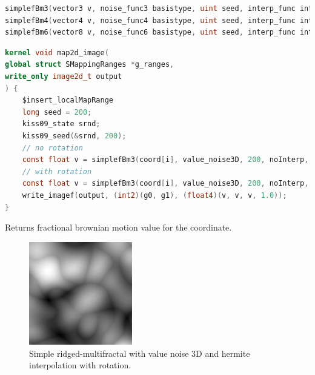 \begin{lstlisting}[caption={Definition of simple brownian motion fractal functions},label={lst:simple_bm_fractal_definition},language=OpenCL]
simplefBm3(vector3 v, noise_func3 basistype, uint seed, interp_func interp, random_func rnd, void *srnd, uint numoctaves, REAL frequency, bool rot);
simplefBm4(vector4 v, noise_func4 basistype, uint seed, interp_func interp, random_func rnd, void *srnd, uint numoctaves, REAL frequency, bool rot);
simplefBm6(vector8 v, noise_func6 basistype, uint seed, interp_func interp, random_func rnd, void *srnd, uint numoctaves, REAL frequency, bool rot);
\end{lstlisting}

\begin{lstlisting}[caption={Example for simple brownian motion fractal functions},label={lst:simple_bm_fractal_example},language=OpenCL]
kernel void map2d_image(
global struct SMappingRanges *g_ranges,
write_only image2d_t output
) {
    $insert_localMapRange
    long seed = 200;
    kiss09_state srnd;
    kiss09_seed(&srnd, 200);
    // no rotation
    const float v = simplefBm3(coord[i], value_noise3D, 200, noInterp, random_kiss09, &srnd, 3, 0.125, false);
    // with rotation
    const float v = simplefBm3(coord[i], value_noise3D, 200, noInterp, random_kiss09, &srnd, 3, 0.125, true);
    write_imagef(output, (int2)(g0, g1), (float4)(v, v, v, 1.0));
}
\end{lstlisting}

Returns fractional brownian motion value for the coordinate.

\begin{figure}[h]
\centering
\includegraphics[width=0.4\textwidth]{out/simpleRidgedMultifractal3/simpleRidgedMultifractal3_value_noise3D_hermiteInterp_rot.png}
\caption{Simple ridged-multifractal with value noise 3D and hermite interpolation with rotation.}
\label{fig:simple_redgedmf3_value_noise3D_hermiteInterp_rot}
\end{figure}

